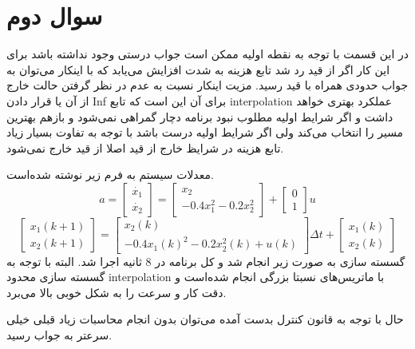 \documentclass[12 pt]{article}
\begin{document}
\section*{سوال دوم}
در این قسمت با توجه به نقطه اولیه ممکن است جواب درستی وجود نداشته باشد برای این کار اگر از قید رد شد تابع هزینه به شدت افزایش می‌یابد که با اینکار می‌توان به جواب حدودی همراه با قید رسید. مزیت اینکار نسبت به عدم در نظر گرفتن حالت خارج از آن یا قرار دادن Inf برای آن این است که تابع interpolation عملکرد بهتری خواهد داشت و اگر شرایط اولیه مطلوب نبود برنامه دچار گمراهی نمی‌شود و بازهم بهترین  مسیر را انتخاب می‌کند ولی اگر شرایط اولیه درست باشد با توجه به تفاوت بسیار زیاد تابع هزینه‌ در شرایظ خارج از قید اصلا از قید خارج نمی‌شود.

معدلات سیستم به فرم زیر نوشته شده‌است.
$$
a = \begin{bmatrix}
	\dot{x_1}\\
	\dot{x_2}
\end{bmatrix} = \begin{bmatrix}
	x_2\\
	-0.4x_1^2 -0.2x_2^2
\end{bmatrix} + \begin{bmatrix}
	0\\
	1
\end{bmatrix}u
$$
$$
\begin{bmatrix}
	x_1(k+1)\\
	x_2(k+1)
\end{bmatrix} = \begin{bmatrix}
	x_2(k)\\
	-0.4x_1(k)^2 -0.2x_2^2(k) + u(k)
\end{bmatrix} \Delta t + \begin{bmatrix}
x_1(k)\\
x_2(k)
\end{bmatrix}
$$
گسسته سازی به صورت زیر انجام شد و کل برنامه در 8 ثانیه اجرا شد. البته با توجه به گسسته سازی محدود interpolation با 
ماتریس‌های نسبتا بزرگی انجام شده‌است و دقت کار و سرعت را به شکل خوبی بالا می‌برد.

حال با توجه به قانون کنترل بدست آمده می‌توان بدون انجام محاسبات زیاد قبلی خیلی سرعتر به جواب رسید.
\end{document}

